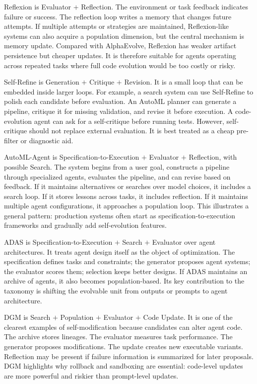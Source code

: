 Reflexion is Evaluator $+$ Reflection.  The environment or task feedback indicates failure or success.  The reflection loop writes a memory that changes future attempts.  If multiple attempts or strategies are maintained, Reflexion-like systems can also acquire a population dimension, but the central mechanism is memory update.  Compared with AlphaEvolve, Reflexion has weaker artifact persistence but cheaper updates.  It is therefore suitable for agents operating across repeated tasks where full code evolution would be too costly or risky.

Self-Refine is Generation $+$ Critique $+$ Revision.  It is a small loop that can be embedded inside larger loops.  For example, a search system can use Self-Refine to polish each candidate before evaluation.  An AutoML planner can generate a pipeline, critique it for missing validation, and revise it before execution.  A code-evolution agent can ask for a self-critique before running tests.  However, self-critique should not replace external evaluation.  It is best treated as a cheap pre-filter or diagnostic aid.

AutoML-Agent is Specification-to-Execution $+$ Evaluator $+$ Reflection, with possible Search.  The system begins from a user goal, constructs a pipeline through specialized agents, evaluates the pipeline, and can revise based on feedback.  If it maintains alternatives or searches over model choices, it includes a search loop.  If it stores lessons across tasks, it includes reflection.  If it maintains multiple agent configurations, it approaches a population loop.  This illustrates a general pattern: production systems often start as specification-to-execution frameworks and gradually add self-evolution features.

ADAS is Specification-to-Execution $+$ Search $+$ Evaluator over agent architectures.  It treats agent design itself as the object of optimization.  The specification defines tasks and constraints; the generator proposes agent systems; the evaluator scores them; selection keeps better designs.  If ADAS maintains an archive of agents, it also becomes population-based.  Its key contribution to the taxonomy is shifting the evolvable unit from outputs or prompts to agent architecture.

DGM is Search $+$ Population $+$ Evaluator $+$ Code Update.  It is one of the clearest examples of self-modification because candidates can alter agent code.  The archive stores lineages.  The evaluator measures task performance.  The generator proposes modifications.  The update creates new executable variants.  Reflection may be present if failure information is summarized for later proposals.  DGM highlights why rollback and sandboxing are essential: code-level updates are more powerful and riskier than prompt-level updates.


